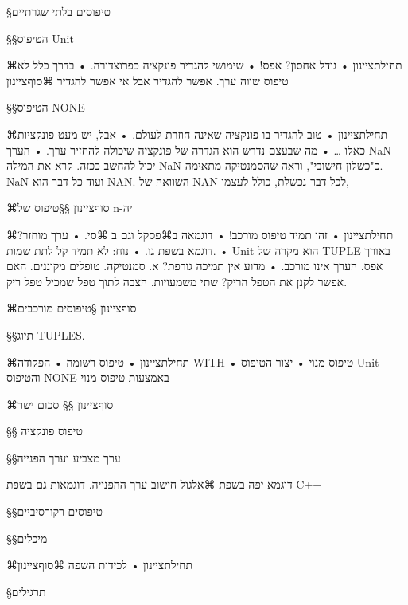 §טיפוסים בלתי שגרתיים

§§הטיפוס Unit

⌘תחילת{ציינון}
• גודל אחסון? אפס!
• שימושי להגדיר פונקציה כפרוצדורה.
• בדרך כלל לא טיפוס שווה ערך. אפשר להגדיר
 אבל אי אפשר להגדיר
⌘סוף{ציינון}

§§הטיפוס NONE

⌘תחילת{ציינון}
• טוב להגדיר בו פונקציה שאינה חוזרת לעולם.
• אבל, יש מעט פונקציות כאלו \ldots
• מה שבעצם נדרש הוא הגדרה של פונקציה שיכולה להחזיר ערך.
• הערך NaN יכול להחשב ככזה. קרא את המילה NaN כ"כשלון חישובי", וראה
שהסמנטיקה מתאימה. NaN ועוד כל דבר הוא NAN. השוואה של NAN לכל דבר נכשלת,
כולל
לעצמו,

⌘סוף{ציינון}
§§טיפוס של n-יה

⌘תחילת{ציינון}
• זהו תמיד טיפוס מורכב!
• דוגמאה ב⌘פסקל וגם ב ⌘סי.
• ערך מוחזר? דוגמא בשפת גו.
• נוח: לא תמיד קל לתת שמות.
• Unit הוא מקרה של TUPLE באורך אפס. הערך אינו מורכב.
• מדוע אין תמיכה גורפת? א. סמנטיקה. טופלים מקוננים. האם אפשר לקנן את הטפל
הריק? שתי משמעויות. הצבה לתוך טפל שמכיל טפל ריק.

⌘סוף{ציינון}
§טיפוסים מורכבים

§§תיוג TUPLES.

⌘תחילת{ציינון}
• טיפוס רשומה
• הפקודה WITH
• טיפוס מנוי
• יצור הטיפוס Unit והטיפוס NONE באמצעות טיפוס מנוי

⌘סוף{ציינון}
§§ סכום ישר

§§ טיפוס פונקציה

§§ערך מצביע וערך הפנייה

דוגמא יפה בשפת
⌘אלגול
חישוב ערך ההפנייה.
דוגמאות גם בשפת C++

§§טיפוסים רקורסיביים

§§מיכלים

⌘תחילת{ציינון}
•
לכידות השפה
⌘סוף{ציינון}

§תרגילים




